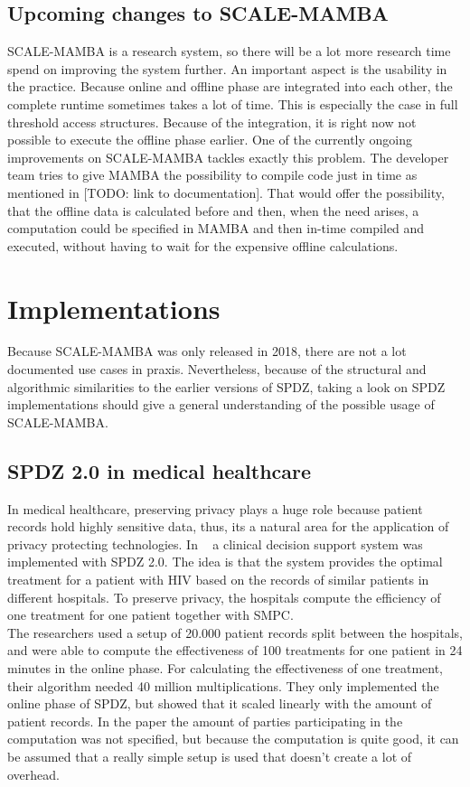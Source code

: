\documentclass[english,runningheads,a4paper]{llncs}[2018/03/10]
\begin{document}
\subsection{Upcoming changes to SCALE-MAMBA}
SCALE-MAMBA is a research system, so there will be a lot more research time spend on improving the system further. An important aspect is the usability in the practice. Because online and offline phase are integrated into each other, the complete runtime sometimes takes a lot of time. This is especially the case in full threshold access structures. Because of the integration, it is right now not possible to execute the offline phase earlier. One of the currently ongoing improvements on SCALE-MAMBA tackles exactly this problem. The developer team tries to give MAMBA the possibility to compile code just in time as mentioned in [TODO: link to documentation]. That would offer the possibility, that the offline data is calculated before and then, when the need arises, a computation could be specified in MAMBA and then in-time compiled and executed, without having to wait for the expensive offline calculations.\\

\section{Implementations}
Because SCALE-MAMBA was only released in 2018, there are not a lot documented use cases in praxis. Nevertheless, because of the structural and algorithmic similarities to the earlier versions of SPDZ, taking a look on SPDZ implementations should give a general understanding of the possible usage of SCALE-MAMBA.\\

\subsection{SPDZ 2.0 in medical healthcare}
In medical healthcare, preserving privacy plays a huge role because patient records hold highly sensitive data, thus, its a natural area for the application of privacy protecting technologies. In ~\cite{PPCDSS} a clinical decision support system was implemented with SPDZ 2.0. The idea is that the system provides the optimal treatment for a patient with HIV based on the  records of similar patients in different hospitals. To preserve privacy, the hospitals compute the efficiency of one treatment for one patient together with SMPC.\\
The researchers used a setup of 20.000 patient records split between the hospitals, and were able to compute the effectiveness of 100 treatments for one patient in 24 minutes in the online phase. For calculating the effectiveness of one treatment, their algorithm needed 40 million multiplications. They only implemented the online phase of SPDZ, but showed that it scaled linearly with the amount of patient records. In the paper the amount of parties participating in the computation was not specified, but because the computation is quite good, it can be assumed that a really simple setup is used that doesn't create a lot of overhead.
\end{document}
